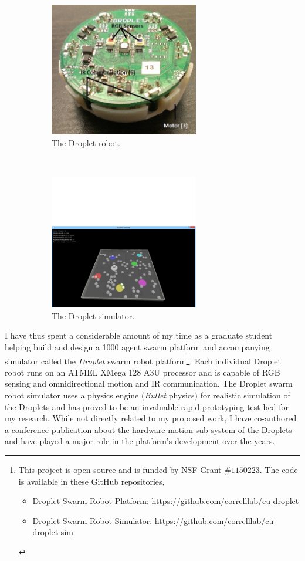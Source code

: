 \documentclass[11pt, onecolumn, compsoc, letterpaper]{article}
\begin{document}
\begin{figure}[!ht]
\begin{subfigure}{.5\textwidth}
\centering\includegraphics[width=6.5cm]{../assets/droplettop.jpg}
\centering\caption{The Droplet robot.}\label{fig:dropletrbt}
\end{subfigure}~
\begin{subfigure}{.5\textwidth}
\centering\includegraphics[width=6.5cm]{../assets/dsim.png}
\centering\caption{The Droplet simulator.}\label{fig:dropletsim}
\end{subfigure}
\caption{}
\end{figure}

I have thus spent a considerable amount of my time as a graduate student helping build and design a 1000 agent swarm platform and accompanying simulator called the \emph{Droplet} swarm robot platform\footnote{This project is open source and is funded by NSF Grant \#$1150223$. The code is available in these GitHub repositories,
\begin{itemize}
\item Droplet Swarm Robot Platform: \url{https://github.com/correlllab/cu-droplet}
\item Droplet Swarm Robot Simulator: \url{https://github.com/correlllab/cu-droplet-sim}
\end{itemize}}. 
Each individual Droplet robot runs on an ATMEL XMega 128 A3U processor and is capable of RGB sensing and omnidirectional motion and IR communication. The Droplet swarm robot simulator uses a physics engine (\emph{Bullet} physics) for realistic simulation of the Droplets and has proved to be an invaluable rapid prototyping test-bed for my research. While not directly related to my proposed work, I have co-authored a conference publication  about the hardware motion sub-system of the Droplets \cite{Klingner2014} and have played a major role in the platform's development over the years.
\end{document}
